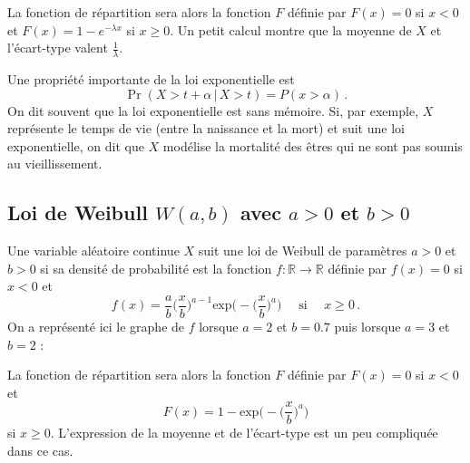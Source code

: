 \documentclass[12pt, a4paper]{book}
\numberwithin{equation}{section}
\begin{document}
La fonction de répartition sera alors la fonction $F$ définie par 
$F(x)=0$ si $x<0$ et $F(x)=1-e^{-\lambda x}$
si $x\geq 0$. Un petit calcul montre que la moyenne de $X$ et l'écart-type valent $\frac{1}{\lambda}$.

Une propriété importante de la loi exponentielle est
$$
\Pr(X>t+\alpha \,|\, X>t)=P(x>\alpha)\,.
$$
On dit souvent que la loi exponentielle est sans mémoire. 
Si, par exemple, $X$ représente le temps de vie (entre la naissance et la mort) et suit une loi exponentielle, on dit que 
$X$ modélise la mortalité des êtres qui ne sont pas soumis au vieillissement.

\subsection[Loi de Weibull]{Loi de Weibull $W(a,b)$ avec $a>0$ et $b>0$}

Une variable aléatoire continue $X$ suit une loi de Weibull de paramètres $a>0$ et $b>0$ si sa densité de probabilité est la 
fonction $f:\mathbb{R}\longrightarrow \mathbb{R}$ définie par  $f(x)=0$ si $x<0$ et
$$
f(x)=\frac{a}{b} \big( \frac{x}{b} \big)^{a-1} \mathrm{exp}\big( - \big( \frac{x}{b} \big)^{a} \big) \quad {\mbox { si }}\quad  x\geq 0\,.
$$
On a représenté ici le graphe de $f$ lorsque $a=2$ et $b=0.7$ puis lorsque $a=3$ et $b=2$ :

\begin{center}
\end{center}


La fonction de répartition sera alors la fonction $F$ définie par $F(x)=0$ si $x<0$ et 
$$
F(x)=1- \mathrm{exp}\big( - \big( \frac{x}{b} \big)^{a} \big)
$$
si $x\geq 0$. L'expression de la moyenne et de l'écart-type est un peu compliquée dans ce cas.
\end{document}
